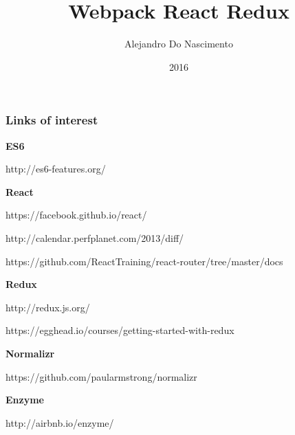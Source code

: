 \documentclass{beamer}
\title{Webpack React Redux}
\author{Alejandro Do Nascimento}
\date{2016}
\begin{document}
\maketitle







\begin{frame}

  \frametitle{Links of interest}
  \begin{footnotesize}
    \textbf{ES6}

    http://es6-features.org/

    \textbf{React}

    https://facebook.github.io/react/

    http://calendar.perfplanet.com/2013/diff/

    https://github.com/ReactTraining/react-router/tree/master/docs

    \textbf{Redux}

    http://redux.js.org/

    https://egghead.io/courses/getting-started-with-redux

    \textbf{Normalizr}

    https://github.com/paularmstrong/normalizr

    \textbf{Enzyme}

    http://airbnb.io/enzyme/
  \end{footnotesize}
\end{frame}
\end{document}
